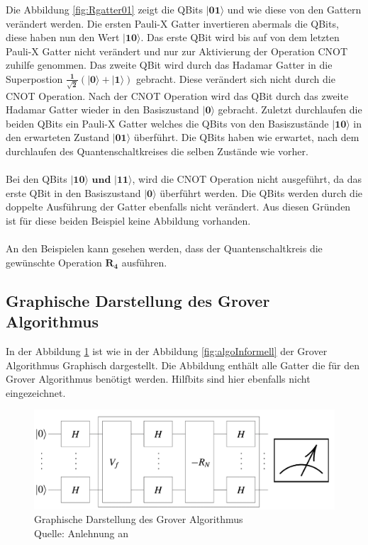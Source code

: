 \noindent
 Die Abbildung \ref{fig:Rgatter01} zeigt die QBits $\mathbf{|01\rangle}$  und wie diese von den Gattern verändert werden. Die ersten Pauli-X Gatter invertieren abermals die QBits, diese haben nun den Wert $\mathbf{|10\rangle}$. Das erste QBit wird bis auf von dem letzten Pauli-X Gatter nicht verändert und nur zur Aktivierung der Operation CNOT zuhilfe genommen. Das zweite QBit wird durch das Hadamar Gatter in die Superpostion $\mathbf{\frac{1}{\sqrt 2}(|0\rangle + |1\rangle)}$ gebracht. Diese verändert sich nicht durch die CNOT Operation. Nach der CNOT Operation wird das QBit durch das zweite Hadamar Gatter wieder in den Basiszustand $\mathbf{|0\rangle}$ gebracht. Zuletzt durchlaufen die beiden QBits ein Pauli-X Gatter welches die QBits von den Basiszustände $\mathbf{|10\rangle}$ in den erwarteten Zustand $\mathbf{|01\rangle}$ überführt. Die QBits haben wie erwartet, nach dem durchlaufen des Quantenschaltkreises die selben Zustände wie vorher.
  \\ 
  \\
Bei den QBits $\mathbf{|10\rangle \text{ und }|11\rangle}$, wird die CNOT Operation nicht ausgeführt, da das erste QBit in den Basiszustand $\mathbf{|0\rangle}$ überführt werden. Die QBits werden durch die doppelte Ausführung der Gatter ebenfalls nicht verändert. Aus diesen Gründen ist für diese beiden Beispiel keine Abbildung vorhanden.
\\
\\
An den Beispielen kann gesehen werden, dass der Quantenschaltkreis die gewünschte Operation $\mathbf{R_4}$ ausführen.

\subsection{Graphische Darstellung des Grover Algorithmus}
In der Abbildung \ref{fig:algoFormell} ist wie in der Abbildung \ref{fig:algoInformell} der Grover Algorithmus Graphisch dargestellt. Die Abbildung enthält alle Gatter die für den Grover Algorithmus benötigt werden. Hilfbits sind hier ebenfalls nicht eingezeichnet.
\begin{figure}[hbtp]
	\centering
	\includegraphics[width=1\textwidth]{figures/algoFormell.png}
	\caption{Graphische Darstellung des Grover Algorithmus \\ Quelle: Anlehnung an \cite[S. 146]{Ho17} }
	\label{fig:algoFormell}
\end{figure}



